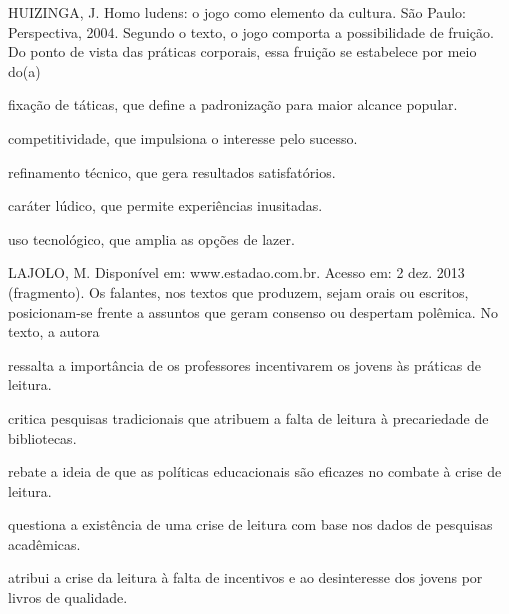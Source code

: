 \questao
{} {
  HUIZINGA, J. Homo ludens: o jogo como elemento da cultura. São Paulo: Perspectiva, 2004.
}
Segundo o texto, o jogo comporta a possibilidade de fruição. Do ponto de vista das práticas corporais, essa fruição se estabelece por meio do(a)
\begin{alternativas}
  \item fixação de táticas, que define a padronização para maior alcance popular.
  \item competitividade, que impulsiona o interesse pelo sucesso.
  \item refinamento técnico, que gera resultados satisfatórios.
  \item caráter lúdico, que permite experiências inusitadas.
  \item uso tecnológico, que amplia as opções de lazer.
\end{alternativas}

% 
\questao
{} {
  LAJOLO, M. Disponível em: www.estadao.com.br. Acesso em: 2 dez. 2013 (fragmento).
}
Os falantes, nos textos que produzem, sejam orais ou escritos, posicionam-se frente a assuntos que geram consenso ou despertam polêmica. No texto, a autora
\begin{alternativas}
  \item ressalta a importância de os professores incentivarem os jovens às práticas de leitura.
  \item critica pesquisas tradicionais que atribuem a falta de leitura à precariedade de bibliotecas.
  \item rebate a ideia de que as políticas educacionais são eficazes no combate à crise de leitura.
  \item questiona a existência de uma crise de leitura com base nos dados de pesquisas acadêmicas.
  \item atribui a crise da leitura à falta de incentivos e ao desinteresse dos jovens por livros de qualidade.
\end{alternativas}

